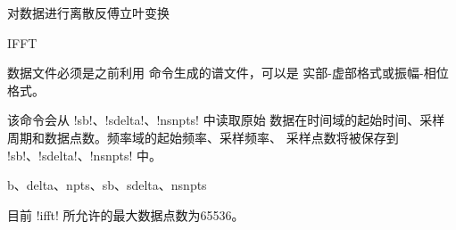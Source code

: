 \label{cmd:ifft}

对数据进行离散反傅立叶变换

\begin{SACSTX}
IFFT
\end{SACSTX}

数据文件必须是之前利用  命令生成的谱文件，可以是
实部-虚部格式或振幅-相位格式。

该命令会从 !sb!、!sdelta!、!nsnpts! 中读取原始
数据在时间域的起始时间、采样周期和数据点数。频率域的起始频率、采样频率、
采样点数将被保存到 !sb!、!sdelta!、!nsnpts! 中。

b、delta、npts、sb、sdelta、nsnpts

目前 !ifft! 所允许的最大数据点数为65536。
